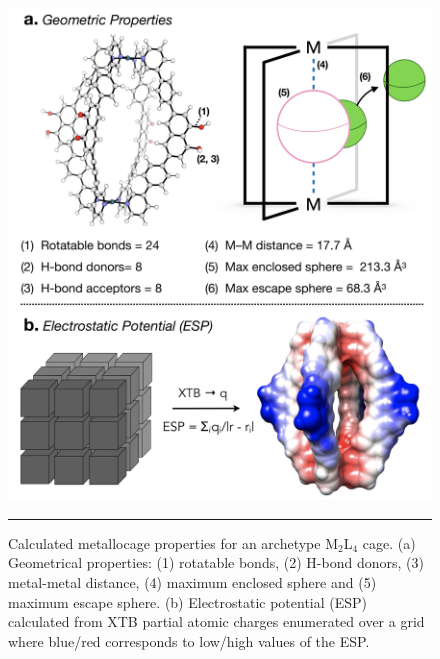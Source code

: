 \documentclass[../../main.tex]{subfiles}
\newcommand{\MLf}{M$_2$L$_4$ }
\begin{document}
\begin{figure}[h!]
	\vspace{0.4cm}
	\centering
	\includegraphics[width=12cm]{3/cgbind/figs/fig4}
	\vspace{0.2cm}
	\hrule
	\caption{Calculated metallocage properties for an archetype \MLf cage. (a) Geometrical properties: (1) rotatable bonds, (2) H-bond donors, (3) metal-metal distance, (4) maximum enclosed sphere and (5) maximum escape sphere. (b) Electrostatic potential (ESP) calculated from XTB partial atomic charges enumerated over a grid where blue/red corresponds to low/high values of the ESP.}
	\label{fig::cg_4}
\end{figure}
\clearpage
\end{document}
